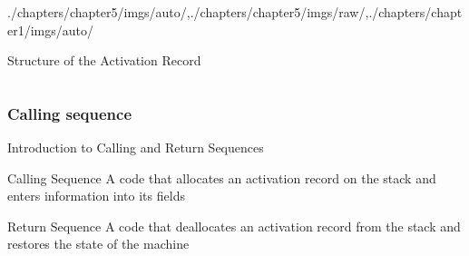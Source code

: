 \begin{graphicspathcontext}{{./chapters/chapter5/imgs/auto/},{./chapters/chapter5/imgs/raw/},{./chapters/chapter1/imgs/auto/}}
\begin{bibunit}[apalike]
\begin{frame}{Structure of the Activation Record}
\begin{columns}
\begin{column}{.7\linewidth}
\begin{small}
			\end{small}
		\end{column}
	\end{columns}
\end{frame}

\subsubsection{Calling sequence}
\subsubsectiontableofcontentslide

\begin{frame}{Introduction to Calling and Return Sequences}
	\begin{definitionblock}{Calling Sequence}
		A code that allocates an activation record on the stack and enters information into its fields
	\end{definitionblock}
	\vspace{.25cm}
	\begin{definitionblock}{Return Sequence}
		A code that deallocates an activation record from the stack and restores the state of the machine
	\end{definitionblock}
	\vspace{.25cm}
\end{frame}


\end{bibunit}
\end{graphicspathcontext}
